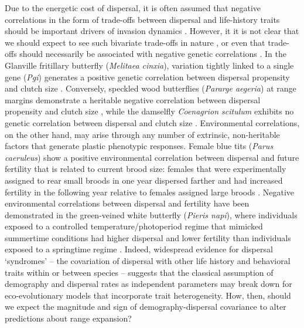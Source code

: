 \documentclass[11pt]{article}
\begin{document}
Due to the energetic cost of dispersal, it is often assumed that negative correlations in the form of trade-offs between dispersal and life-history traits should be important drivers of invasion dynamics \citep{hanski_dispersal-related_2006,chuang_expanding_2016}.
However, it it is not clear that we should expect to see such bivariate trade-offs in nature \citep{saltz_trait_2017}, or even that trade-offs should necessarily be associated with negative genetic correlations \citep{houle_genetic_1991}.
In the Glanville fritillary butterfly (\textit{Melitaea cinxia}), variation tightly linked to a single gene (\textit{Pgi}) generates a positive genetic correlation between dispersal propensity and clutch size \citep{hanski_dispersal-related_2006,bonte_dispersal_2012}.
Conversely, speckled wood butterflies (\textit{Pararge aegeria}) at range margins demonstrate a heritable negative correlation between dispersal propensity and clutch size \citep{hughes_evolutionary_2003}, while the damselfly \textit{Coenagrion scitulum} exhibits no genetic correlation between dispersal and clutch size \citep{therry_higher_2014}.
Environmental correlations, on the other hand, may arise through any number of extrinsic, non-heritable factors that generate plastic phenotypic responses.
Female blue tits (\textit{Parus caeruleus}) show a positive environmental correlation between dispersal and future fertility that is related to current brood size: females that were experimentally assigned to rear small broods in one year dispersed farther and had increased fertility in the following year relative to females assigned large broods \citep{nur_consequences_1988}.
Negative environmental correlations between dispersal and fertility have been demonstrated in the green-veined white butterfly (\textit{Pieris napi}), where individuals exposed to a controlled temperature/photoperiod regime that mimicked summertime conditions had higher dispersal and lower fertility than individuals exposed to a springtime regime \citep{karlsson_seasonal_2008}.
Indeed, widespread evidence for dispersal `syndromes' -- the covariation of dispersal with other life history and behavioral traits within \citep{clobert2009informed} or between \citep{comte2018evidence,stevens2014comparative} species -- suggests that the classical assumption of demography and dispersal rates as independent parameters may break down for eco-evolutionary models that incorporate trait heterogeneity.
How, then, should we expect the magnitude and sign of demography-dispersal covariance to alter predictions about range expansion?
\end{document}
